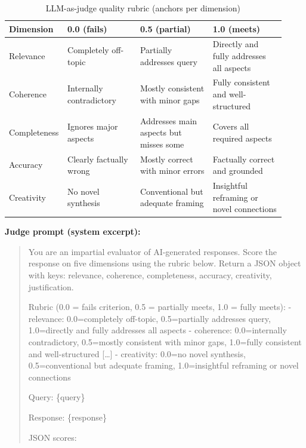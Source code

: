 \documentclass{iopjournal}
\begin{document}
{\color{red}
\begin{table}[H]
\centering
\caption{LLM-as-judge quality rubric (anchors per dimension)}
\label{tab:rubric}
\small
\begin{tabular}{@{}>{\raggedright\arraybackslash}p{0.14\linewidth}>{\raggedright\arraybackslash}p{0.26\linewidth}>{\raggedright\arraybackslash}p{0.26\linewidth}>{\raggedright\arraybackslash}p{0.26\linewidth}@{}}
\toprule
\textbf{Dimension} & \textbf{0.0 (fails)} & \textbf{0.5 (partial)} & \textbf{1.0 (meets)} \\
\midrule
Relevance & Completely off-topic & Partially addresses query & Directly and fully addresses all aspects \\
Coherence & Internally contradictory & Mostly consistent with minor gaps & Fully consistent and well-structured \\
Completeness & Ignores major aspects & Addresses main aspects but misses some & Covers all required aspects \\
Accuracy & Clearly factually wrong & Mostly correct with minor errors & Factually correct and grounded \\
Creativity & No novel synthesis & Conventional but adequate framing & Insightful reframing or novel connections \\
\bottomrule
\end{tabular}
\end{table}

\textbf{Judge prompt (system excerpt):}
\begin{quote}\small\ttfamily
You are an impartial evaluator of AI-generated responses. Score the response on five dimensions using the rubric below. Return a JSON object with keys: relevance, coherence, completeness, accuracy, creativity, justification.

Rubric (0.0 = fails criterion, 0.5 = partially meets, 1.0 = fully meets):
- relevance: 0.0=completely off-topic, 0.5=partially addresses query, 1.0=directly and fully addresses all aspects
- coherence: 0.0=internally contradictory, 0.5=mostly consistent with minor gaps, 1.0=fully consistent and well-structured
[\ldots]
- creativity: 0.0=no novel synthesis, 0.5=conventional but adequate framing, 1.0=insightful reframing or novel connections

Query: \{query\}

Response: \{response\}

JSON scores:
\end{quote}
}


\end{document}
